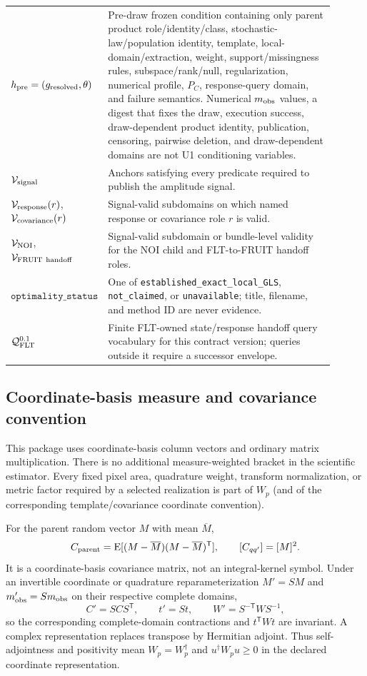 \begin{longtable}{p{0.20\linewidth}p{0.70\linewidth}}
$h_{\rm pre}=(g_{\rm resolved},\theta)$ & Pre-draw frozen condition containing
only parent product role/identity/class, stochastic-law/population identity,
template, local-domain/extraction, weight, support/missingness rules,
subspace/rank/null, regularization, numerical profile, $P_C$, response-query
domain, and failure semantics. Numerical $m_{\rm obs}$ values, a digest that
fixes the draw, execution success, draw-dependent product identity,
publication, censoring, pairwise deletion, and draw-dependent domains are not
U1 conditioning variables. \\
$\mathcal{V}_{\rm signal}$ & Anchors satisfying every predicate required to publish
the amplitude signal. \\
$\mathcal{V}_{\rm response}(r)$, $\mathcal{V}_{\rm covariance}(r)$ & Signal-valid
subdomains on which named response or covariance role $r$ is valid. \\
$\mathcal{V}_{\rm NOI}$, $\Valid_{\rm FRUIT\ handoff}$ & Signal-valid subdomain or
bundle-level validity for the NOI child and FLT-to-FRUIT handoff roles. \\
$\texttt{optimality\_status}$ & One of
\texttt{established\_exact\_local\_GLS}, \texttt{not\_claimed}, or
\texttt{unavailable}; title, filename, and method ID are never evidence. \\
$\mathcal Q_{\rm FLT}^{0.1}$ & Finite FLT-owned state/response handoff query
vocabulary for this contract version; queries outside it require a successor
envelope. \\
\bottomrule
\end{longtable}

\subsection{Coordinate-basis measure and covariance convention}
\label{sec:measure-convention}

This package uses coordinate-basis column vectors and ordinary matrix
multiplication. There is no additional measure-weighted bracket in the
scientific estimator. Every fixed pixel area, quadrature weight, transform
normalization, or metric factor required by a selected realization is part of
$W_p$ (and of the corresponding template/covariance coordinate convention).

For the parent random vector $M$ with mean $\overline M$,
\[
 C_{\rm parent}=\operatorname E[(M-\overline M)(M-\overline M)^{\mathsf T}],
 \qquad [C_{qq'}]=[M]^2.
\]
It is a coordinate-basis covariance matrix, not an integral-kernel symbol.
Under an invertible coordinate or quadrature reparameterization $M'=SM$ and
$m_{\rm obs}'=Sm_{\rm obs}$ on their respective complete domains,
\[
 C'=SC S^{\mathsf T},\qquad
 t'=St,\qquad
 W'=S^{-\mathsf T}WS^{-1},
\]
so the corresponding complete-domain contractions and $t^{\mathsf T}Wt$ are
invariant. A complex
representation replaces transpose by Hermitian adjoint. Thus
self-adjointness and positivity mean $W_p=W_p^{\dagger}$ and
$u^{\dagger}W_pu\geq0$ in the declared coordinate representation.

